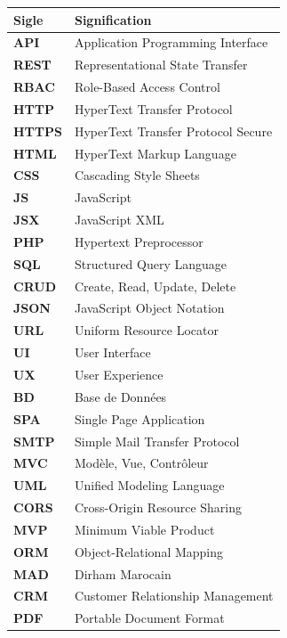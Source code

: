 \documentclass[12pt, a4paper]{report}
\begin{document}
\begin{longtable}{@{}p{3cm}p{11.5cm}@{}}
\toprule
\textbf{Sigle} & \textbf{Signification} \\
\midrule
\endhead
\textbf{API}   & Application Programming Interface \\[3pt]
\textbf{REST}  & Representational State Transfer \\[3pt]
\textbf{RBAC}  & Role-Based Access Control \\[3pt]
\textbf{HTTP}  & HyperText Transfer Protocol \\[3pt]
\textbf{HTTPS} & HyperText Transfer Protocol Secure \\[3pt]
\textbf{HTML}  & HyperText Markup Language \\[3pt]
\textbf{CSS}   & Cascading Style Sheets \\[3pt]
\textbf{JS}    & JavaScript \\[3pt]
\textbf{JSX}   & JavaScript XML \\[3pt]
\textbf{PHP}   & Hypertext Preprocessor \\[3pt]
\textbf{SQL}   & Structured Query Language \\[3pt]
\textbf{CRUD}  & Create, Read, Update, Delete \\[3pt]
\textbf{JSON}  & JavaScript Object Notation \\[3pt]
\textbf{URL}   & Uniform Resource Locator \\[3pt]
\textbf{UI}    & User Interface \\[3pt]
\textbf{UX}    & User Experience \\[3pt]
\textbf{BD}    & Base de Données \\[3pt]
\textbf{SPA}   & Single Page Application \\[3pt]
\textbf{SMTP}  & Simple Mail Transfer Protocol \\[3pt]
\textbf{MVC}   & Modèle, Vue, Contrôleur \\[3pt]
\textbf{UML}   & Unified Modeling Language \\[3pt]
\textbf{CORS}  & Cross-Origin Resource Sharing \\[3pt]
\textbf{MVP}   & Minimum Viable Product \\[3pt]
\textbf{ORM}   & Object-Relational Mapping \\[3pt]
\textbf{MAD}   & Dirham Marocain \\[3pt]
\textbf{CRM}   & Customer Relationship Management \\[3pt]
\textbf{PDF}   & Portable Document Format \\[3pt]

\end{longtable}
\end{document}

